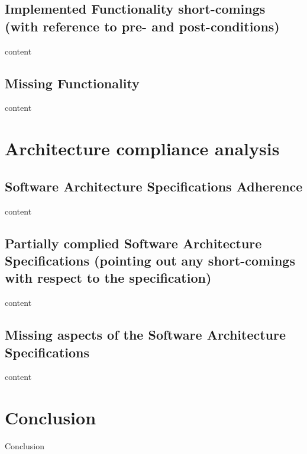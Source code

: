 \documentclass{article}
\begin{document}
    \subsection{Implemented Functionality short-comings (with reference to pre- and post-conditions)}
    content

    \subsection{Missing Functionality}
    content

   \newpage

\section{Architecture compliance analysis}
     \subsection{Software Architecture Specifications Adherence}
     content

     \subsection{Partially complied Software Architecture Specifications (pointing out any short-comings with respect to the specification)}
     content

     \subsection{Missing aspects of the Software Architecture Specifications}
     content

   	\newpage

\section{Conclusion}

Conclusion
\end{document}
